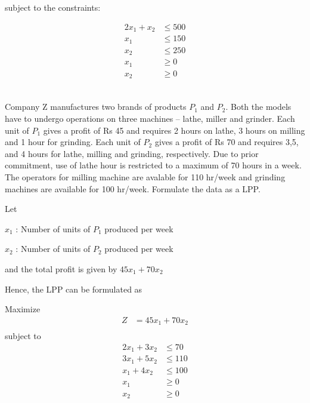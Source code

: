 \documentclass[12pt]{article}
\begin{document}
subject to the constraints:

\begin{align*}
2 x_1 + x_2 & \le 500 \\
x_1         & \le 150 \\
x_2         & \le 250 \\
x_1         & \ge 0   \\
x_2         & \ge 0   \\
\end{align*}
\subsection{}

Company Z manufactures two brands of products $P_1$ and $P_2$. Both the models have to undergo operations on three machines -- lathe, miller and grinder. Each unit of $P_1$ gives a profit of Rs 45 and requires 2 hours on lathe, 3 hours on milling and 1 hour for grinding. Each unit of $P_2$ gives a profit of Rs 70 and requires 3,5, and 4 hours for lathe, milling and grinding, respectively. Due to prior commitment, use of lathe hour is restricted to a maximum of 70 hours in a week. The operators for milling machine are avalable for 110 hr/week and grinding machines are available for 100 hr/week. Formulate the data as a LPP.

Let 

$x_1$ : Number of units of $P_1$ produced per week

$x_2$ : Number of units of $P_2$ produced per week

and the total profit is given by $45x_1 + 70x_2$

Hence, the LPP can be formulated as 

Maximize
\begin{align*}
Z         & = 45x_1 + 70x_2 \\
\end{align*}
subject to
\begin{align*}
2x_1+3x_2 & \le 70          \\
3x_1+5x_2 & \le 110         \\
x_1+4x_2  & \le 100         \\
x_1       & \ge 0           \\
x_2       & \ge 0           \\
\end{align*}
\subsection{}
\end{document}
